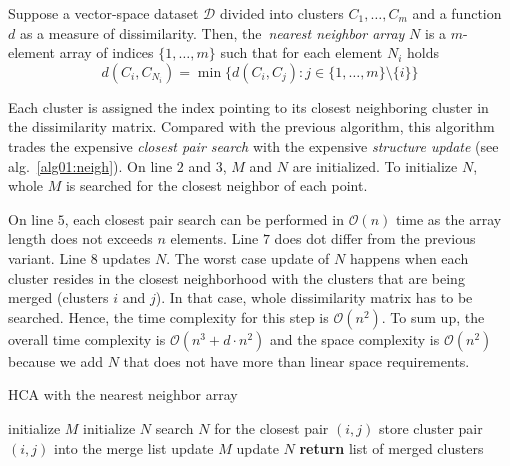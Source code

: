 \begin{defn}
	Suppose a vector-space dataset $\mathcal{D}$ divided into clusters $C_1,\dots,C_m$ and a function $d$ as a measure of dissimilarity. Then, the~\emph{nearest neighbor array} $N$ is a $m$-element array of indices $\{1,\dots,m\}$ such that for each element $N_i$ holds
	$$d(C_i,C_{N_i}) = \min\{d(C_i,C_j) : j \in \{1,\dots,m\} \setminus \{i\}\}$$
	\label{def01:neigh}
\end{defn}

Each cluster is assigned the index pointing to its closest neighboring cluster in the dissimilarity matrix. 
Compared with the previous algorithm, this algorithm trades the expensive \emph{closest pair search} with the expensive \emph{structure update}  (see alg.~\ref{alg01:neigh}). On line $2$ and $3$, $M$ and $N$ are initialized. To initialize $N$, whole $M$ is searched for the closest neighbor of each point. 

On line $5$, each closest pair search can be performed in $\mathcal{O}(n)$ time as the array length does not exceeds $n$ elements. Line $7$ does dot differ from the previous variant. Line $8$ updates $N$. The worst case update of $N$ happens when each cluster resides in the closest neighborhood with the clusters that are being merged (clusters $i$  and $j$). In that case, whole dissimilarity matrix has to be searched. Hence, the time complexity for this step is $\mathcal{O}(n^2)$. To sum up, the overall time complexity is $\mathcal{O}(n^3+d\cdot n^2)$ and the space complexity is $\mathcal{O}(n^2)$ because we add $N$ that does not have more than linear space requirements.



\begin{algorithm}[t]
	\caption{HCA with the nearest neighbor array}
	\label{alg01:neigh}
	\begin{algorithmic}[1]
		\State initialize $M$ 
		\State initialize $N$ 
		\State search $N$ for the closest pair $(i,j)$ 
		\State store cluster pair $(i,j)$ into the merge list 
		\State update $M$ 
		\State update $N$ 
		\EndFor
		\State \textbf{return} list of merged clusters
		\EndProcedure
	\end{algorithmic}
\end{algorithm}

